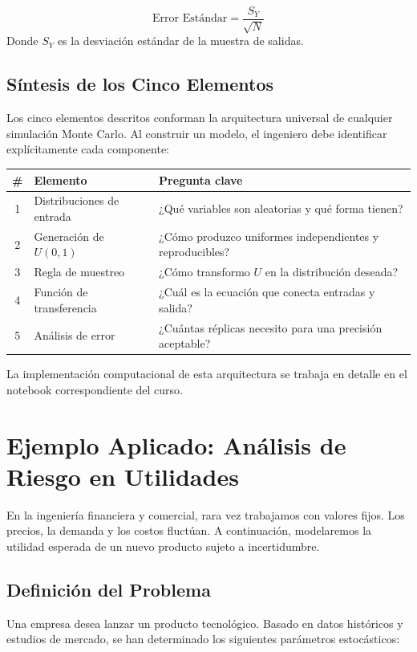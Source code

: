 \documentclass[11pt, letterpaper]{article}
\begin{document}
\begin{equation}
    \text{Error Estándar} = \frac{S_Y}{\sqrt{N}}
\end{equation}
Donde $S_Y$ es la desviación estándar de la muestra de salidas.

\subsection{Síntesis de los Cinco Elementos}

Los cinco elementos descritos conforman la arquitectura universal de cualquier simulación Monte Carlo. Al construir un modelo, el ingeniero debe identificar explícitamente cada componente:

\begin{center}
\small
\begin{tabular}{clp{6cm}}
\toprule
\textbf{\#} & \textbf{Elemento} & \textbf{Pregunta clave} \\
\midrule
1 & Distribuciones de entrada & ¿Qué variables son aleatorias y qué forma tienen? \\
2 & Generación de $U(0,1)$ & ¿Cómo produzco uniformes independientes y reproducibles? \\
3 & Regla de muestreo & ¿Cómo transformo $U$ en la distribución deseada? \\
4 & Función de transferencia & ¿Cuál es la ecuación que conecta entradas y salida? \\
5 & Análisis de error & ¿Cuántas réplicas necesito para una precisión aceptable? \\
\bottomrule
\end{tabular}
\end{center}

La implementación computacional de esta arquitectura se trabaja en detalle en el notebook correspondiente del curso.


\section{Ejemplo Aplicado: Análisis de Riesgo en Utilidades}

En la ingeniería financiera y comercial, rara vez trabajamos con valores fijos. Los precios, la demanda y los costos fluctúan. A continuación, modelaremos la utilidad esperada de un nuevo producto sujeto a incertidumbre.

\subsection{Definición del Problema}
Una empresa desea lanzar un producto tecnológico. Basado en datos históricos y estudios de mercado, se han determinado los siguientes parámetros estocásticos:
\end{document}

